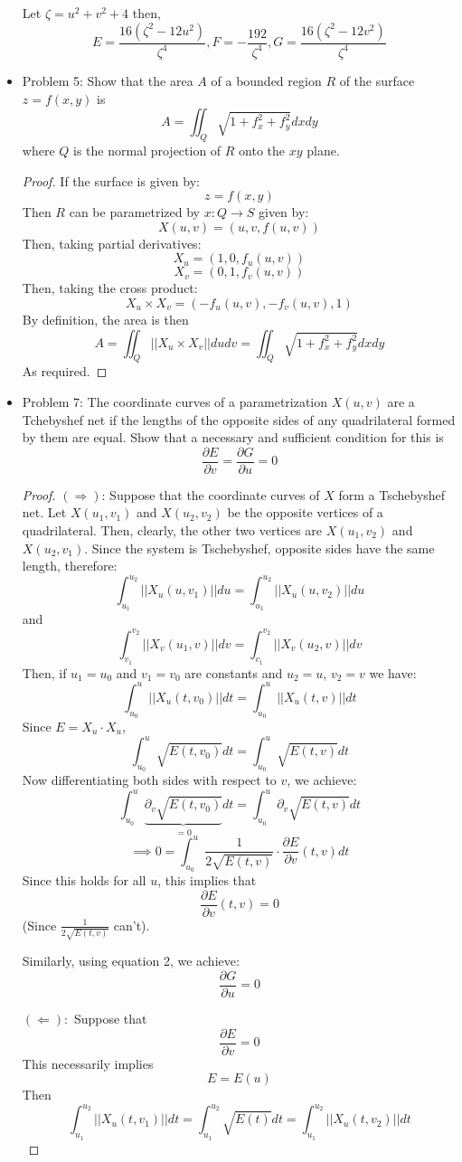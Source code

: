 \documentclass[a4paper,17pt]{extarticle}
\theoremstyle{definition}
\renewcommand{\skip}{\par\null\par}
\begin{document}
\begin{itemize}
    Let $\zeta=u^2+v^2+4$ then, $$E=\frac{16(\zeta^2-12u^2)}{\zeta^4},F=-\frac{192}{\zeta^4},G=\frac{16(\zeta^2-12v^2)}{\zeta^4}$$
    \item Problem 5: Show that the area $A$ of a bounded region $R$ of the surface $z=f(x,y)$ is $$A=\iint_Q\sqrt{1+f^2_x+f^2_y}dxdy$$ where $Q$ is the normal projection of $R$ onto the $xy$ plane.\begin{proof}If the surface is given by: $$z=f(x,y)$$ Then $R$ can be parametrized by $x:Q\to S$ given by: $$X(u,v)=(u,v,f(u,v))$$ Then, taking partial derivatives: $$X_u=(1,0,f_u(u,v))$$ $$X_v=(0,1,f_v(u,v))$$ Then, taking the cross product: $$X_u\times X_v=(-f_u(u,v),-f_v(u,v),1)$$ By definition, the area is then $$A=\iint_Q||X_u\times X_v||dudv=\iint_Q\sqrt{1+f^2_x+f^2_y}dxdy$$ As required.
    \end{proof}
    \item Problem 7: The coordinate curves of a parametrization $X(u,v)$ are a Tchebyshef net if the lengths of the opposite sides of any quadrilateral formed by them are equal. Show that a necessary and sufficient condition for this is $$\frac{\partial E}{\partial v}=\frac{\partial G}{\partial u}=0$$\begin{proof} $(\Longrightarrow)$: Suppose that the coordinate curves of $X$ form a Tschebyshef net. Let $X(u_1,v_1)$ and $X(u_2,v_2)$ be the opposite vertices of a quadrilateral. Then, clearly, the other two vertices are $X(u_1,v_2)$ and $X(u_2,v_1)$. Since the system is Tschebyshef, opposite sides have the same length, therefore: $$\int_{u_1}^{u_2}||X_u(u,v_1)||du=\int_{u_1}^{u_2}||X_u(u,v_2)||du$$
    and $$\int_{v_1}^{v_2}||X_v(u_1,v)||dv=\int_{v_1}^{v_2}||X_v(u_2,v)||dv$$ Then, if $u_1=u_0$ and $v_1=v_0$ are constants and $u_2=u$, $v_2=v$ we have: $$\int_{u_0}^u||X_u(t,v_0)||dt=\int_{u_0}^u||X_u(t,v)||dt$$ Since $E=X_u\cdot X_u$, $$\int_{u_0}^u\sqrt{E(t,v_0)}dt=\int_{u_0}^u\sqrt{E(t,v)}dt$$ Now differentiating both sides with respect to $v$, we achieve: $$\int_{u_0}^u\underbrace{\partial_v\sqrt{E(t,v_0)}}_{=0}dt=\int_{u_0}^u\partial_v\sqrt{E(t,v)}dt$$ $$\implies 0=\int_{u_0}^u\frac{1}{2\sqrt{E(t,v)}}\cdot\frac{\partial E}{\partial v}(t,v)dt$$ Since this holds for all $u$, this implies that $$\frac{\partial E}{\partial v}(t,v)=0$$ (Since $\frac{1}{2\sqrt{E(t,v)}}$ can't).\skip
    Similarly, using equation 2, we achieve: $$\frac{\partial G}{\partial u}=0$$
    \skip $(\Longleftarrow):$ Suppose that $$\frac{\partial E}{\partial v}=0$$ This necessarily implies $$E=E(u)$$ Then $$\int_{u_1}^{u_2}||X_u(t,v_1)||dt=\int_{u_1}^{u_2}\sqrt{E(t)}dt=\int_{u_1}^{u_2}||X_u(t,v_2)||dt$$

\end{proof}
\end{itemize}
\end{document}
